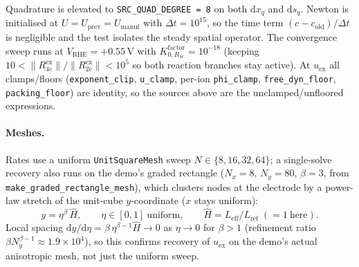 \documentclass[11pt]{article}
\newcommand{\ex}{\mathrm{ex}}
\begin{document}
\noindent
Quadrature is elevated to \verb|SRC_QUAD_DEGREE = 8| on both
$\mathrm{d}x_q$ and $\mathrm{d}s_q$. Newton is initialised at
$U = U_\mathrm{prev} = U_\mathrm{manuf}$ with $\Delta t = 10^{15}$, so the
time term $(c-c_\mathrm{old})/\Delta t$ is negligible and the test isolates
the steady spatial operator. The convergence sweep runs at
$V_\mathrm{RHE}=+0.55\,\mathrm{V}$ with $K_{0,R_{4e}}^\mathrm{factor}=10^{-18}$
(keeping $10 < \lVert R_{4e}^\ex\rVert/\lVert R_{2e}^\ex\rVert < 10^5$ so both
reaction branches stay active). At $u_\ex$ all clamps/floors
(\texttt{exponent\_clip}, \texttt{u\_clamp}, per-ion \texttt{phi\_clamp},
\texttt{free\_dyn\_floor}, \texttt{packing\_floor}) are identity, so the
sources above are the unclamped/unfloored expressions.

\paragraph{Meshes.} Rates use a uniform \verb|UnitSquareMesh| sweep
$N\in\{8,16,32,64\}$; a single-solve recovery also runs on the demo's
graded rectangle ($N_x=8$, $N_y=80$, $\beta=3$, from
\verb|make_graded_rectangle_mesh|), which clusters nodes at the electrode by
a power-law stretch of the unit-cube $y$-coordinate ($x$ stays uniform):
\begin{equation}
  y = \eta^{\beta}\,\hat H,
  \qquad \eta\in[0,1]\ \text{uniform},
  \qquad \hat H = L_\mathrm{eff}/L_\mathrm{ref}\;(=1\ \text{here}).
  \tag{5}
\end{equation}
Local spacing $\mathrm{d}y/\mathrm{d}\eta = \beta\,\eta^{\beta-1}\hat H\to 0$
as $\eta\to 0$ for $\beta>1$ (refinement ratio $\beta N_y^{\beta-1}\approx
1.9\times10^{4}$), so this confirms recovery of $u_\ex$ on the demo's actual
anisotropic mesh, not just the uniform sweep.
\end{document}
